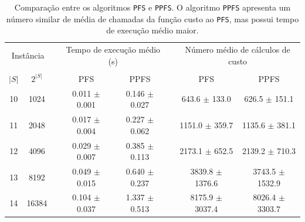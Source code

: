 \documentclass[12pt]{article}
\newcommand{\algname}[1]{\texttt{#1}}
\begin{document}
\begin{table}
\centering
\footnotesize
\caption{Comparação entre os algoritmos \algname{PFS} e \algname{PPFS}.
O algoritmo \algname{PPFS} apresenta um número similar de média de 
chamadas da função custo ao \algname{PFS}, mas possui tempo de execução 
médio maior.}
\label{tab:ppfs_vs_pfs}
\begin{tabular}{cc c cc c cc}
\toprule
\multicolumn{2}{c}{Instância} & \phantom{} & \multicolumn{2}{c}{Tempo de execução médio (s)} & \phantom{} & \multicolumn{2}{c}{Número médio de cálculos de custo} \\
\cline{1-2}\cline{4-5}\cline{7-8}\\
$|S|$ & $2^{|S|}$ && PFS & PPFS && PFS & PPFS \\
10 &    1024 && 0.011 $\pm$ 0.001 & 0.146 $\pm$ 0.027 && 643.6 $\pm$ 133.0 & 626.5 $\pm$ 151.1 \\
11 &    2048 && 0.017 $\pm$ 0.004 & 0.227 $\pm$ 0.062 && 1151.0 $\pm$ 359.7 & 1135.6 $\pm$ 381.1 \\
12 &    4096 && 0.029 $\pm$ 0.007 & 0.385 $\pm$ 0.113 && 2173.1 $\pm$ 652.5 & 2139.2 $\pm$ 710.3 \\
13 &    8192 && 0.049 $\pm$ 0.015 & 0.640 $\pm$ 0.237 && 3839.8 $\pm$ 1376.6 & 3743.5 $\pm$ 1532.9 \\
14 &   16384 && 0.104 $\pm$ 0.037 & 1.337 $\pm$ 0.513 && 8175.9 $\pm$ 3037.4 & 8026.4 $\pm$ 3303.7 \\

\end{tabular}
\end{table}
\end{document}
